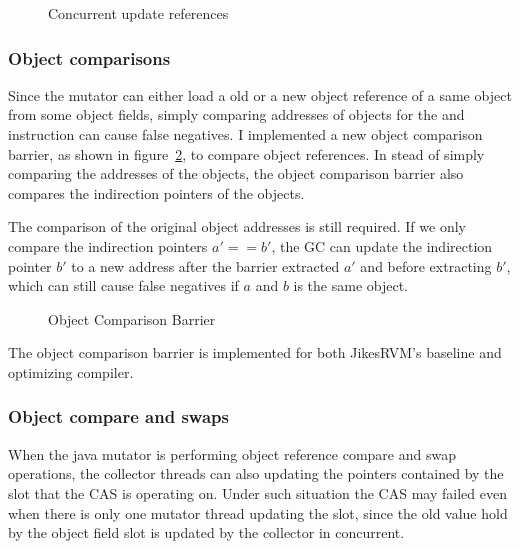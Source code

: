 \begin{figure}
  \centering
  
  \caption{Concurrent update references}
  \label{fig:concupdaterefs}
\end{figure}

\subsubsection{Object comparisons}

Since the mutator can either load a old or a new object reference of a same object
from some object fields, simply comparing addresses of objects for the  and 
instruction can cause false negatives. I implemented a new object comparison barrier,
as shown in figure~\ref{fig:objectcomparisonbarrier}, to compare object references.
In stead of simply comparing the addresses of the objects, the object comparison barrier also
compares the indirection pointers of the objects.

The comparison of the original object addresses is still required. If we only compare the
indirection pointers $a' == b'$, the GC can update the indirection pointer $b'$ to a new
address after the barrier extracted $a'$ and before extracting $b'$, which can still cause false
negatives if $a$ and $b$ is the same object.

\begin{figure}
  \centering
  
  \caption{Object Comparison Barrier}
  \label{fig:objectcomparisonbarrier}
\end{figure}

The object comparison barrier is implemented for both JikesRVM's baseline and optimizing compiler.

\subsubsection{Object compare and swaps}

When the java mutator is performing object reference compare and swap operations,
the collector threads can also updating the pointers contained by the slot that the CAS
is operating on. Under such situation the CAS may failed even when there is only one mutator
thread updating the slot, since the old value hold by the object field slot is updated
by the collector in concurrent.

